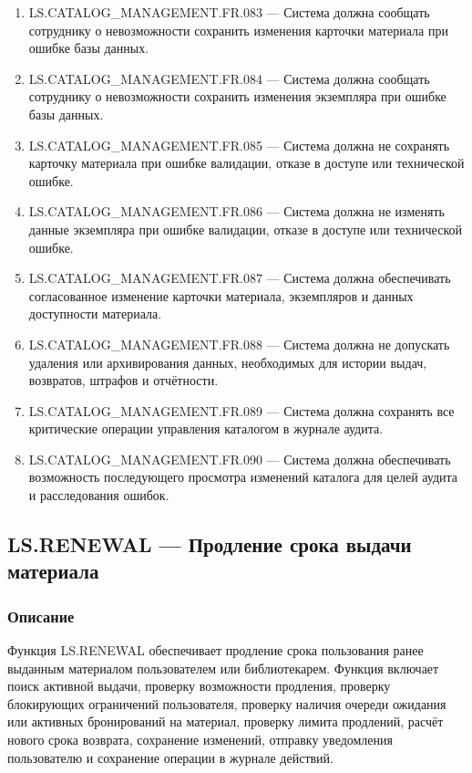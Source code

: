\documentclass[12pt,a4paper]{article}
\begin{document}
\begin{enumerate}
		\item LS.CATALOG\_MANAGEMENT.FR.083 --- Система должна сообщать сотруднику о
		невозможности сохранить изменения карточки материала при ошибке базы данных.
		
		\item LS.CATALOG\_MANAGEMENT.FR.084 --- Система должна сообщать сотруднику о
		невозможности сохранить изменения экземпляра при ошибке базы данных.
		
		\item LS.CATALOG\_MANAGEMENT.FR.085 --- Система должна не сохранять карточку
		материала при ошибке валидации, отказе в доступе или технической ошибке.
		
		\item LS.CATALOG\_MANAGEMENT.FR.086 --- Система должна не изменять данные
		экземпляра при ошибке валидации, отказе в доступе или технической ошибке.
		
		\item LS.CATALOG\_MANAGEMENT.FR.087 --- Система должна обеспечивать согласованное
		изменение карточки материала, экземпляров и данных доступности материала.
		
		\item LS.CATALOG\_MANAGEMENT.FR.088 --- Система должна не допускать удаления
		или архивирования данных, необходимых для истории выдач, возвратов, штрафов
		и отчётности.
		
		\item LS.CATALOG\_MANAGEMENT.FR.089 --- Система должна сохранять все критические
		операции управления каталогом в журнале аудита.
		
		\item LS.CATALOG\_MANAGEMENT.FR.090 --- Система должна обеспечивать возможность
		последующего просмотра изменений каталога для целей аудита и расследования
		ошибок.
	\end{enumerate}
	
	\subsection{LS.RENEWAL --- Продление срока выдачи материала}
	
	\subsubsection{Описание}
	
	Функция LS.RENEWAL обеспечивает продление срока пользования ранее выданным
	материалом пользователем или библиотекарем. Функция включает поиск активной
	выдачи, проверку возможности продления, проверку блокирующих ограничений
	пользователя, проверку наличия очереди ожидания или активных бронирований
	на материал, проверку лимита продлений, расчёт нового срока возврата, сохранение
	изменений, отправку уведомления пользователю и сохранение операции в журнале
	действий.
	
\end{document}
